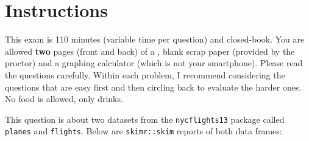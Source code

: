 \documentclass[12pt]{article}
\begin{document}
\section*{Instructions}
This exam is 110 minutes (variable time per question) and closed-book. You are allowed \textbf{two} pages (front and back) of a , blank scrap paper (provided by the proctor) and a graphing calculator (which is not your smartphone). Please read the questions carefully. Within each problem, I recommend considering the questions that are easy first and then circling back to evaluate the harder ones. No food is allowed, only drinks. %

\pagebreak


\problem This question is about two datasets from the \texttt{nycflights13} package called \texttt{planes} and \texttt{flights}. Below are \texttt{skimr::skim} reports of both data frames:
\end{document}
